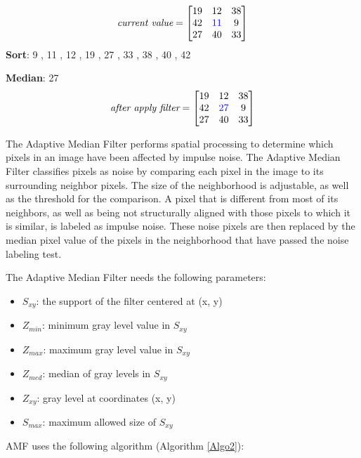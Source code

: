 \begin{center}
	\[
	\textit{current value} =  
	\begin{bmatrix}
		19 & 12 & 38 \\
		42 & \textcolor{blue}{11} & 9 \\
		27 & 40 & 33
	\end{bmatrix}
	\]
	\textbf{Sort}: 9 , 11 , 12 , 19 , 27 , 33 , 38 , 40 , 42
	
	\textbf{Median}: 27
	\[
	\textit{after apply filter} =  
	\begin{bmatrix}
		19 & 12 & 38 \\
		42 & \textcolor{blue}{27} & 9 \\
		27 & 40 & 33
	\end{bmatrix}
	\]
\end{center}

The Adaptive Median Filter performs spatial processing to determine which
pixels in an image have been affected by impulse noise. The Adaptive Median Filter classifies pixels as noise by comparing each pixel in the image to its surrounding neighbor pixels. The size of the neighborhood is adjustable, as well as the threshold for the comparison. A pixel that is different from most of its neighbors, as well as being not structurally aligned with those pixels to which it is similar, is labeled as impulse noise. These noise pixels are then replaced by the
median pixel value of the pixels in the neighborhood that have passed the noise labeling test. 

The Adaptive Median Filter needs the following parameters:

\begin{itemize}
	\item \textbf{$S_{xy}$}: the support of the filter centered at (x, y)
	\item \textbf{$Z_{min}$}: minimum gray level value in $S_{xy}$
	\item \textbf{$Z_{max}$}: maximum gray level value in $S_{xy}$
	\item \textbf{$Z_{med}$}: median of gray levels in $S_{xy}$
	\item \textbf{$Z_{xy}$}: gray level at coordinates (x, y)
	\item \textbf{$S_{max}$}: maximum allowed size of $S_{xy}$
\end{itemize}

AMF uses the following algorithm (Algorithm \ref{Algo2}):

